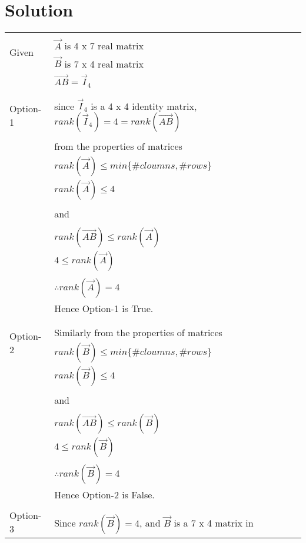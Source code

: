 \documentclass[journal,12pt]{IEEEtran}
\begin{document}
\section{\textbf{Solution}}
\renewcommand{\thetable}{1}
\begin{longtable}{|l|l|}
\hline
\multirow{3}{*}{Given} & \\
& $\vec{A}$ is 4 x 7 real matrix\\
& $\vec{B}$ is 7 x 4 real matrix\\
& $\vec{AB} =\vec{I}_4 $\\
&\\
\hline
\multirow{3}{*}{Option-1} & \\
& since $\vec{I}_4$ is a 4 x 4 identity matrix, $rank(\vec{I}_4) = 4 = rank(\vec{AB})$\\
& \\
& from the properties of matrices\\
& $rank(\vec{A}) \leq min\lbrace \# cloumns, \#rows \rbrace$\\
& $rank(\vec{A}) \leq 4$\\
& \\
& and\\
& \\
& $rank(\vec{AB}) \leq rank(\vec{A})$\\
& $ 4 \leq rank(\vec{A})$\\
& \\
& $\therefore rank(\vec{A}) = 4$\\
& Hence Option-1 is True. \\
& \\
\hline
\multirow{3}{*}{Option-2} & \\
& Similarly from the properties of matrices\\
& $rank(\vec{B}) \leq min\lbrace \# cloumns, \#rows \rbrace$\\
& $rank(\vec{B}) \leq 4$\\
& \\
& and\\
& \\
& $rank(\vec{AB}) \leq rank(\vec{B})$\\
& $ 4 \leq rank(\vec{B})$\\
& \\
& $\therefore rank(\vec{B}) = 4$\\
& Hence Option-2 is False. \\
& \\
\hline
\multirow{3}{*}{Option-3} & \\
& Since $rank(\vec{B}) = 4$, and $\vec{B}$ is a 7 x 4 matrix in \\

\end{longtable}
\end{document}
